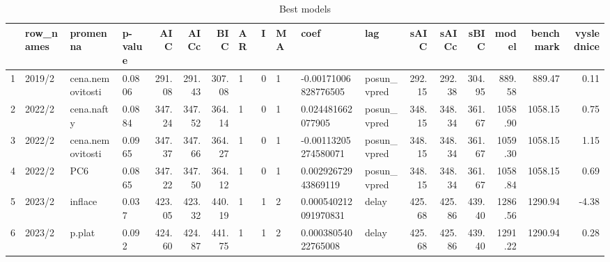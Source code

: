 \begin{table}[ht]
\centering
\begin{tabular}{rlllrrrlllllrrrrrr}
  \hline
 & row\_names & promenna & p-value & AIC & AICc & BIC & AR & I & MA & coef & lag & sAIC & sAICc & sBIC & model & benchmark & vyslednice \\ 
  \hline
1 & 2019/2 & cena.nemovitosti & 0.0806 & 291.08 & 291.43 & 307.08 & 1 & 0 & 1 & -0.00171006828776505 & posun\_vpred & 292.15 & 292.38 & 304.95 & 889.58 & 889.47 & 0.11 \\ 
  2 & 2022/2 & cena.nafty & 0.0884 & 347.24 & 347.52 & 364.14 & 1 & 0 & 1 & 0.024481662077905 & posun\_vpred & 348.15 & 348.34 & 361.67 & 1058.90 & 1058.15 & 0.75 \\ 
  3 & 2022/2 & cena.nemovitosti & 0.0965 & 347.37 & 347.66 & 364.27 & 1 & 0 & 1 & -0.00113205274580071 & posun\_vpred & 348.15 & 348.34 & 361.67 & 1059.30 & 1058.15 & 1.15 \\ 
  4 & 2022/2 & PC6 & 0.0865 & 347.22 & 347.50 & 364.12 & 1 & 0 & 1 & 0.00292672943869119 & posun\_vpred & 348.15 & 348.34 & 361.67 & 1058.84 & 1058.15 & 0.69 \\ 
  5 & 2023/2 & inflace & 0.037 & 423.05 & 423.32 & 440.19 & 1 & 1 & 2 & 0.000540212091970831 & delay & 425.68 & 425.86 & 439.40 & 1286.56 & 1290.94 & -4.38 \\ 
  6 & 2023/2 & p.plat & 0.092 & 424.60 & 424.87 & 441.75 & 1 & 1 & 2 & 0.00038054022765008 & delay & 425.68 & 425.86 & 439.40 & 1291.22 & 1290.94 & 0.28 \\ 
   \hline
\end{tabular}
\caption{Best models} 
\end{table}
